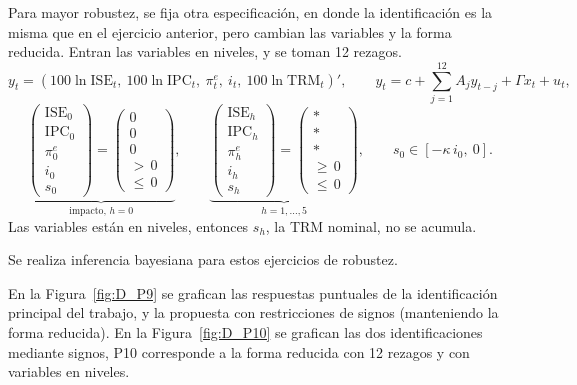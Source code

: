 \documentclass[12pt,letterpaper]{article}
\begin{document}
Para mayor robustez, se fija otra especificación, en donde la identificación es la misma que en el ejercicio anterior, pero cambian las variables y la forma reducida. Entran las variables en niveles, y se toman 12 rezagos.
\begin{equation}\label{eq:D_var10}
y_t = (100\ln \mathrm{ISE}_t,\ 100\ln \mathrm{IPC}_t,\ \pi^e_t,\ i_t,\ 100\ln \mathrm{TRM}_t)', \qquad
y_t = c + \sum_{j=1}^{12} A_j y_{t-j} + \Gamma x_t + u_t,
\end{equation}
\begin{equation}\label{eq:D_signos10}
\underbrace{\begin{pmatrix} \mathrm{ISE}_0\\ \mathrm{IPC}_0\\ \pi^e_0\\ i_0\\ s_0 \end{pmatrix} =
\begin{pmatrix} 0\\ 0\\ 0\\ {>}\,0\\ {\le}\,0 \end{pmatrix}}_{\text{impacto, } h=0},
\qquad
\underbrace{\begin{pmatrix} \mathrm{ISE}_h\\ \mathrm{IPC}_h\\ \pi^e_h\\ i_h\\ s_h \end{pmatrix} =
\begin{pmatrix} *\\ *\\ *\\ {\ge}\,0\\ {\le}\,0 \end{pmatrix}}_{h = 1,\dots,5},
\qquad s_0 \in [-\kappa\, i_0,\ 0].
\end{equation}
Las variables están en niveles, entonces $s_h$, la TRM nominal, no se acumula.

Se realiza inferencia bayesiana para estos ejercicios de robustez.

En la Figura~\ref{fig:D_P9} se grafican las respuestas puntuales de la identificación principal del trabajo, y la propuesta con restricciones de signos (manteniendo la forma reducida).
En la Figura~\ref{fig:D_P10} se grafican las dos identificaciones mediante signos, P10 corresponde a la forma reducida con 12 rezagos y con variables en niveles.
\end{document}
